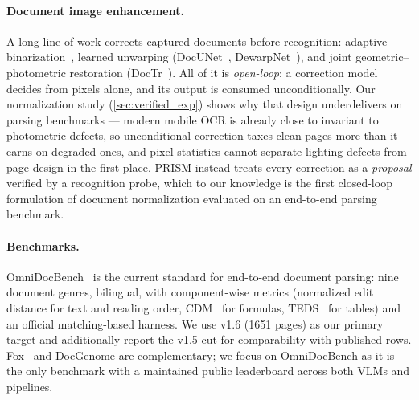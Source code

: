 \paragraph{Document image enhancement.}
A long line of work corrects captured documents before recognition: adaptive binarization~\cite{sauvola}, learned unwarping (DocUNet~\cite{docunet}, DewarpNet~\cite{dewarpnet}), and joint geometric--photometric restoration (DocTr~\cite{doctr}). All of it is \emph{open-loop}: a correction model decides from pixels alone, and its output is consumed unconditionally. Our normalization study (\cref{sec:verified_exp}) shows why that design underdelivers on parsing benchmarks --- modern mobile OCR is already close to invariant to photometric defects, so unconditional correction taxes clean pages more than it earns on degraded ones, and pixel statistics cannot separate lighting defects from page design in the first place. PRISM instead treats every correction as a \emph{proposal} verified by a recognition probe, which to our knowledge is the first closed-loop formulation of document normalization evaluated on an end-to-end parsing benchmark.

\paragraph{Benchmarks.}
OmniDocBench~\cite{omnidocbench} is the current standard for end-to-end document parsing: nine document genres, bilingual, with component-wise metrics (normalized edit distance for text and reading order, CDM~\cite{cdm} for formulas, TEDS~\cite{teds} for tables) and an official matching-based harness. We use v1.6 (1651 pages) as our primary target and additionally report the v1.5 cut for comparability with published rows. Fox~\cite{fox} and DocGenome are complementary; we focus on OmniDocBench as it is the only benchmark with a maintained public leaderboard across both VLMs and pipelines.
